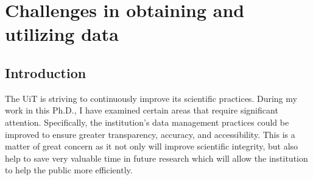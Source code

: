 \begin{comment}

\begin{comment}
To improve the discussion chapter, consider the following:

Identify common themes: Look at the discussions in each paper and identify common themes or findings that are relevant across multiple papers. This will help you identify the big picture implications of your research and tie the individual papers together.

Offer a synthesis: The discussion chapter should offer a synthesis of your research findings. This means that you should connect the dots between different papers and draw conclusions about what your research means as a whole.

Provide a comprehensive analysis: Consider expanding beyond the direct implications of your research and providing a comprehensive analysis of the field or discipline in which your research is situated. This can provide context for your research findings and help readers understand the broader implications of your work.

Address limitations and future directions: In addition to discussing your findings, it is important to address the limitations of your research and provide suggestions for future directions for research in your field.

Consider the audience: Keep in mind the audience for your discussion chapter. It should be accessible to a broad range of readers and written in clear, jargon-free language.

Overall, the discussion chapter should tie the individual papers together and provide a comprehensive analysis of your research findings. It should offer a synthesis of key themes and draw conclusions about the significance of your research within the broader context of your field or discipline.
\end{comment}



\section{Challenges in obtaining and utilizing data}

\subsection{Introduction}

The UiT is striving to continuously improve its scientific practices. During my work in this Ph.D., I have examined certain areas that require significant attention. Specifically, the institution's data management practices could be improved to ensure greater transparency, accuracy, and accessibility. This is a matter of great concern as it not only will improve scientific integrity, but also help to save very valuable time in future research which will allow the institution to help the public more efficiently.

